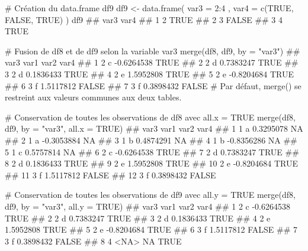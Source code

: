 \documentclass[12pt,twosided, notitlepage]{book}
\newenvironment{Shaded}{}{}
\newcommand{\CommentTok}[1]{\textcolor[rgb]{0.00,0.50,0.00}{#1}}
\newcommand{\DataTypeTok}[1]{#1}
\newcommand{\DecValTok}[1]{#1}
\newcommand{\KeywordTok}[1]{\textcolor[rgb]{0.00,0.00,1.00}{#1}}
\newcommand{\NormalTok}[1]{#1}
\newcommand{\OperatorTok}[1]{#1}
\newcommand{\OtherTok}[1]{\textcolor[rgb]{1.00,0.25,0.00}{#1}}
\newcommand{\StringTok}[1]{\textcolor[rgb]{0.00,0.50,0.50}{#1}}
\renewenvironment{Shaded}{\begin{snugshade}}{\end{snugshade}}
\begin{document}
\begin{Shaded}
\begin{Highlighting}[]
\CommentTok{# Création du data.frame df9}
\NormalTok{df9 <-}\StringTok{ }\KeywordTok{data.frame}\NormalTok{(}
  \DataTypeTok{var3 =} \DecValTok{2}\OperatorTok{:}\DecValTok{4}
\NormalTok{  , }\DataTypeTok{var4 =} \KeywordTok{c}\NormalTok{(}\OtherTok{TRUE}\NormalTok{, }\OtherTok{FALSE}\NormalTok{, }\OtherTok{TRUE}\NormalTok{)}
\NormalTok{)}
\NormalTok{df9}
\NormalTok{  ##   var3  var4}
\NormalTok{  ## 1    2  TRUE}
\NormalTok{  ## 2    3 FALSE}
\NormalTok{  ## 3    4  TRUE}

\CommentTok{# Fusion de df8 et de df9 selon la variable var3}
\KeywordTok{merge}\NormalTok{(df8, df9, }\DataTypeTok{by =} \StringTok{"var3"}\NormalTok{)}
\NormalTok{  ##   var3 var1       var2  var4}
\NormalTok{  ## 1    2    c -0.6264538  TRUE}
\NormalTok{  ## 2    2    d  0.7383247  TRUE}
\NormalTok{  ## 3    2    d  0.1836433  TRUE}
\NormalTok{  ## 4    2    e  1.5952808  TRUE}
\NormalTok{  ## 5    2    e -0.8204684  TRUE}
\NormalTok{  ## 6    3    f  1.5117812 FALSE}
\NormalTok{  ## 7    3    f  0.3898432 FALSE}
\CommentTok{# Par défaut, merge() se restreint aux valeurs communes aux deux tables.}

\CommentTok{# Conservation de toutes les observations de df8 avec all.x = TRUE}
\KeywordTok{merge}\NormalTok{(df8, df9, }\DataTypeTok{by =} \StringTok{"var3"}\NormalTok{, }\DataTypeTok{all.x =} \OtherTok{TRUE}\NormalTok{)}
\NormalTok{  ##    var3 var1       var2  var4}
\NormalTok{  ## 1     1    a  0.3295078    NA}
\NormalTok{  ## 2     1    a -0.3053884    NA}
\NormalTok{  ## 3     1    b  0.4874291    NA}
\NormalTok{  ## 4     1    b -0.8356286    NA}
\NormalTok{  ## 5     1    c  0.5757814    NA}
\NormalTok{  ## 6     2    c -0.6264538  TRUE}
\NormalTok{  ## 7     2    d  0.7383247  TRUE}
\NormalTok{  ## 8     2    d  0.1836433  TRUE}
\NormalTok{  ## 9     2    e  1.5952808  TRUE}
\NormalTok{  ## 10    2    e -0.8204684  TRUE}
\NormalTok{  ## 11    3    f  1.5117812 FALSE}
\NormalTok{  ## 12    3    f  0.3898432 FALSE}

\CommentTok{# Conservation de toutes les observations de df9 avec all.y = TRUE}
\KeywordTok{merge}\NormalTok{(df8, df9, }\DataTypeTok{by =} \StringTok{"var3"}\NormalTok{, }\DataTypeTok{all.y =} \OtherTok{TRUE}\NormalTok{)}
\NormalTok{  ##   var3 var1       var2  var4}
\NormalTok{  ## 1    2    c -0.6264538  TRUE}
\NormalTok{  ## 2    2    d  0.7383247  TRUE}
\NormalTok{  ## 3    2    d  0.1836433  TRUE}
\NormalTok{  ## 4    2    e  1.5952808  TRUE}
\NormalTok{  ## 5    2    e -0.8204684  TRUE}
\NormalTok{  ## 6    3    f  1.5117812 FALSE}
\NormalTok{  ## 7    3    f  0.3898432 FALSE}
\NormalTok{  ## 8    4 <NA>         NA  TRUE}
\end{Highlighting}
\end{Shaded}
\end{document}
